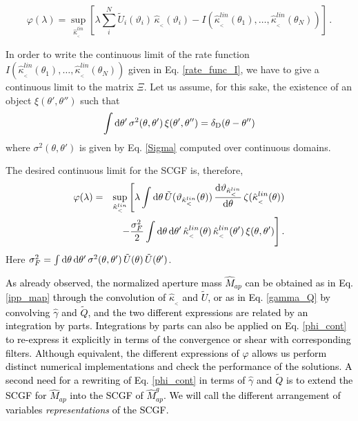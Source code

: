 \documentclass[twocolumn,aps,reprint, nofootinbib]{revtex4}
\newcommand{\dd}{{\rm d}}
\newcommand{\Dirac}{\delta_{\rm D}}
\newcommand{\hkappa}{\hat{\kappa}_{_<}}
\newcommand{\hgamma}{\hat{\gamma}}
\newcommand{\tU}{\tilde{U}}
\newcommand{\tQ}{\tilde{Q}}
\newcommand{\vark}{\vartheta_{\hkappa^{lin}}}
\newcommand{\Map}{\hat{M}_{ap}}
\newcommand{\Mapg}{\hat{M}_{ap}^g}
\newcommand{\pr}[1]{{\textcolor{black}{\textit{} #1}}}
\begin{document}
\begin{equation}
\varphi(\lambda) = \sup_{ {\hkappa^{lin}} } \left[ \lambda \sum_i^N \tU_i(\vartheta_i) \, \hkappa (\vartheta_i) -  I(\hkappa^{lin}(\theta_1), \ldots, \hkappa^{lin}(\theta_N)) \right] \, .
\end{equation}

In order to write the continuous limit of the rate function $ I(\hkappa^{lin}(\theta_1), \ldots, \hkappa^{lin}(\theta_N))$ given in Eq. \eqref{rate_func_I}, we have to give a continuous limit to the matrix $\Xi$. Let us assume, for this sake, the existence of an object $\xi(\theta', \theta'')$ such that
\begin{equation}
\label{invert_xi}
\int \dd \theta' \, \sigma^2(\theta, \theta') \, \xi(\theta', \theta'')  = \Dirac(\theta-\theta'')
\end{equation}
where $\sigma^2(\theta, \theta') $ is given by Eq. \eqref{Sigma} computed over continuous domains.

The desired continuous limit for the SCGF is, therefore,
\begin{eqnarray}
\label{phi_cont}
\varphi(\lambda) & = & \sup_{\hkappa^{lin}} \Bigg[ \lambda \int \dd \theta \, \tU(\vark(\theta)) \, \frac{\dd \vark}{\dd \theta}  \, \zeta(\hkappa^{lin} (\theta)) \nonumber\\ & & - \frac{\sigma^2_{F}}{2} \int \dd \theta \, \dd \theta' \, \hkappa^{lin} (\theta) \, \hkappa^{lin} (\theta') \, \xi(\theta, \theta') \Bigg] \, .
\end{eqnarray} 
Here $\sigma_F^2 = \int \dd \theta \, \dd \theta' \, \sigma^2 (\theta, \theta') \, \tilde{U}(\theta) \, \tilde{U}(\theta')$.  

\pr{As already observed, the normalized aperture mass $\Map$ can be obtained as in Eq. \eqref{ipp_map} through the convolution of $\hkappa$ and $\tU$, or as in Eq. \eqref{gamma_Q} by convolving $\hgamma$ and $\tQ$, and the two different expressions are related by an integration by parts. Integrations by parts can also be applied on Eq. \eqref{phi_cont} to re-express it explicitly in terms of the convergence or shear with corresponding filters. Although equivalent, the different expressions of $\varphi$ allows us perform distinct numerical implementations  and check the performance of the solutions. A second need for a rewriting of Eq. \eqref{phi_cont} in terms of $\hgamma$ and $\tQ$ is to extend the SCGF for $\Map$ into the SCGF of $\Mapg$. We will call the different arrangement of variables \emph{representations} of the SCGF.}
\end{document}
